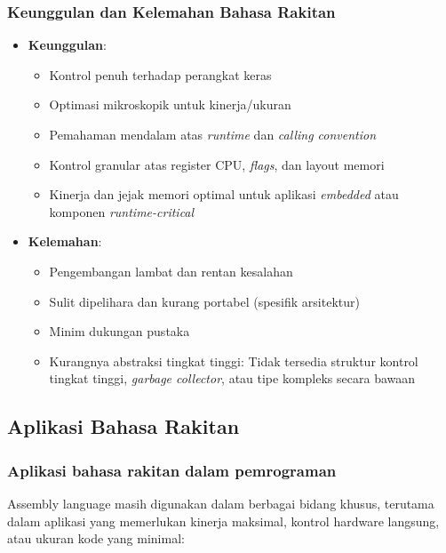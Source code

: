 \subsubsection{Keunggulan dan Kelemahan Bahasa Rakitan}
\begin{itemize}
    \item \textbf{Keunggulan}:
    \begin{itemize}
        \item Kontrol penuh terhadap perangkat keras
        \item Optimasi mikroskopik untuk kinerja/ukuran
        \item Pemahaman mendalam atas \textit{runtime} dan \textit{calling convention}
        \item Kontrol granular atas register CPU, \textit{flags}, dan layout memori
        \item Kinerja dan jejak memori optimal untuk aplikasi \textit{embedded} atau komponen \textit{runtime-critical}
    \end{itemize}
    \item \textbf{Kelemahan}:
    \begin{itemize}
        \item Pengembangan lambat dan rentan kesalahan
        \item Sulit dipelihara dan kurang portabel (spesifik arsitektur)
        \item Minim dukungan pustaka
        \item Kurangnya abstraksi tingkat tinggi: Tidak tersedia struktur kontrol tingkat tinggi, \textit{garbage collector}, atau tipe kompleks secara bawaan
    \end{itemize}
\end{itemize}

\subsection{Aplikasi Bahasa Rakitan}\label{subsec:pengenalan-aplikasi}

\subsubsection{Aplikasi bahasa rakitan dalam pemrograman}
Assembly language masih digunakan dalam berbagai bidang khusus, terutama dalam aplikasi yang memerlukan kinerja maksimal, kontrol hardware langsung, atau ukuran kode yang minimal:

